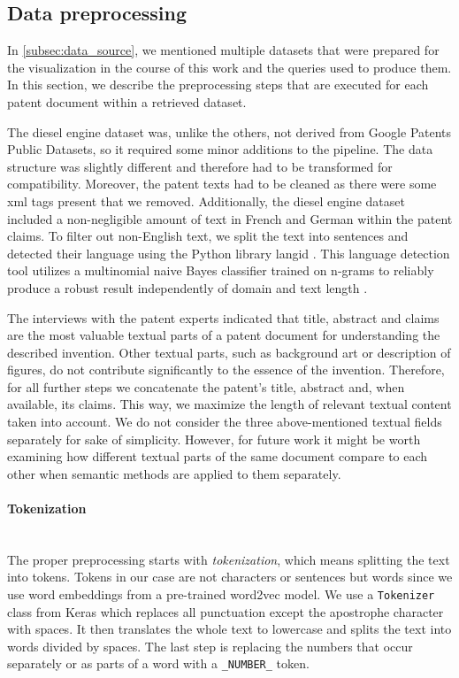 \subsection{Data preprocessing}
\label{subsec:data_preprocessing}

In \autoref{subsec:data_source}, we mentioned multiple datasets that were prepared for the visualization in the course of this work and the queries used to produce them.
In this section, we describe the preprocessing steps that are executed for each patent document within a retrieved dataset.

The diesel engine dataset was, unlike the others, not derived from Google Patents Public Datasets, so it required some minor additions to the pipeline.
The data structure was slightly different and therefore had to be transformed for compatibility.
Moreover, the patent texts had to be cleaned as there were some \gls{xml} tags present that we removed.
Additionally, the diesel engine dataset included a non-negligible amount of text in French and German within the patent claims. 
To filter out non-English text, we split the text into sentences and detected their language using the Python library langid \cite{Lui2012}.
This language detection tool utilizes a multinomial naive Bayes classifier trained on n-grams to reliably produce a robust result independently of domain and text length \cite{Lui2011}.

The interviews with the patent experts indicated that title, abstract and claims are the most valuable textual parts of a patent document for understanding the described invention.
Other textual parts, such as background art or description of figures, do not contribute significantly to the essence of the invention.
Therefore, for all further steps we concatenate the patent's title, abstract and, when available, its claims.
This way, we maximize the length of relevant textual content taken into account.
We do not consider the three above-mentioned textual fields separately for sake of simplicity.
However, for future work it might be worth examining how different textual parts of the same document compare to each other when semantic methods are applied to them separately.

\paragraph{Tokenization}~\\
The proper preprocessing starts with \textit{tokenization}, which means splitting the text into tokens.
Tokens in our case are not characters or sentences but words since we use word embeddings from a pre-trained word2vec model.
We use a \verb|Tokenizer| class from Keras which replaces all punctuation except the apostrophe character with spaces.
It then translates the whole text to lowercase and splits the text into words divided by spaces.
The last step is replacing the numbers that occur separately or as parts of a word with a \verb|_NUMBER_| token. 

